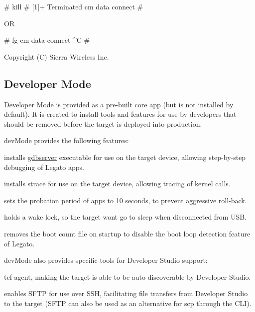 \begin{DoxyVerb}# kill %
#
[1]+ Terminated           cm data connect
#
\end{DoxyVerb}


OR

\begin{DoxyVerb}# fg
cm data connect
^C
#
\end{DoxyVerb}


Copyright (C) Sierra Wireless Inc. \hypertarget{basicTargetDevMode}{}\subsection{Developer Mode}\label{basicTargetDevMode}
Developer Mode is provided as a pre-\/built core app (but is not installed by default). It is created to install tools and features for use by developers that should be removed before the target is deployed into production.

{\ttfamily dev\+Mode} provides the following features\+:~\newline

\begin{DoxyItemize}
\item installs \hyperlink{howToDebugGDB}{gdbserver} executable for use on the target device, allowing step-\/by-\/step debugging of Legato apps.
\item installs strace for use on the target device, allowing tracing of kernel calls.
\item sets the probation period of apps to 10 seconds, to prevent aggressive roll-\/back.
\item holds a wake lock, so the target won\textquotesingle{}t go to sleep when disconnected from U\+SB.
\item removes the boot count file on startup to disable the boot loop detection feature of Legato.
\end{DoxyItemize}

{\ttfamily dev\+Mode} also provides specific tools for Developer Studio support\+:
\begin{DoxyItemize}
\item tcf-\/agent, making the target is able to be auto-\/discoverable by Developer Studio.
\item enables S\+F\+TP for use over S\+SH, facilitating file transfers from Developer Studio to the target (S\+F\+TP can also be used as an alternative for scp through the C\+LI).
\end{DoxyItemize}

